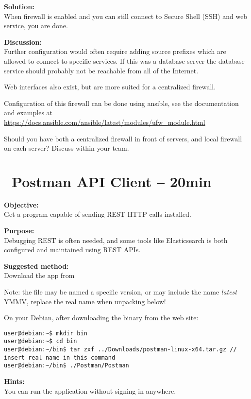 \documentclass[a4paper,11pt,notitlepage]{report}
\begin{document}
{\bf Solution:}\\
When firewall is enabled and you can still connect to Secure Shell (SSH) and web service, you are done.

{\bf Discussion:}\\
Further configuration would often require adding source prefixes which are allowed to connect to specific services. If this was a database server the database service should probably not be reachable from all of the Internet.

Web interfaces also exist, but are more suited for a centralized firewall.

Configuration of this firewall can be done using ansible, see the documentation and examples at \url{https://docs.ansible.com/ansible/latest/modules/ufw_module.html}

Should you have both a centralized firewall in front of servers, and local firewall on each server? Discuss within your team.




\chapter{\faExclamationTriangle\ Postman API Client -- 20min}
\label{ex:postman-api}


{\bf Objective:}\\
Get a program capable of sending REST HTTP calls installed.

{\bf Purpose:}\\
Debugging REST is often needed, and some tools like Elasticsearch is both configured and maintained using REST APIs.

{\bf Suggested method:}\\
Download the app from 

Note: the file may be named a specific version, or may include the name \emph{latest} YMMV, replace the real name when unpacking below!

On your Debian, after downloading the binary from the web site:
\begin{verbatim}
user@debian:~$ mkdir bin
user@debian:~$ cd bin
user@debian:~/bin$ tar zxf ../Downloads/postman-linux-x64.tar.gz // insert real name in this command
user@debian:~/bin$ ./Postman/Postman
\end{verbatim}

{\bf Hints:}\\
You can run the application without signing in anywhere.
\end{document}
